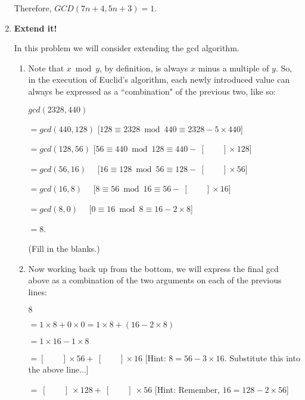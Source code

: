 \documentclass[11pt]{article}
\newif\ifsolutions
\begin{document}
\begin{enumerate}
Therefore, $GCD(7n+4,5n+3)=1$.
\fi

\vspace{30mm}

\item {\bf Extend it!}

In this problem we will consider extending the gcd algorithm.

\begin{enumerate}

\item Note that $x \bmod y$, by definition, is always $x$ minus a multiple of $y$. So, in the execution of Euclid's algorithm, each newly introduced value can always be expressed as a ``combination" of the previous two, like so:

$ gcd(2328, 440)$ 

$= gcd(440, 128)$ [$128 \equiv 2328 \bmod{440} \equiv 2328 - 5 \times 440$] 

$= gcd(128, 56)$   [$56 \equiv 440 \bmod {128} \equiv 440 - \ [\quad \quad] \times 128$]  \ifsolutions  {\bf solution}:  $[?] = 3$ \fi

$= gcd(56, 16)$ \ \  [$16 \equiv 128 \bmod{56} \equiv 128 - \ [\quad \quad] \times 56$]   \ifsolutions  {\bf solution}:  $[?] = 2$ \fi

$= gcd(16, 8)$  \ \ [$8 \equiv 56 \bmod{16} \equiv 56 - \ [\quad \quad] \times 16$] \ifsolutions {\bf solution}: $[?] = 3$ \fi

$= gcd(8, 0)$  \ \ [$0 \equiv 16 \bmod{8} \equiv 16 - 2 \times 8$]

$= 8$.

(Fill in the blanks.)


\item Now working back up from the bottom, we will express the final gcd above as a combination of the two arguments on each of the previous lines:

$8$

$= 1 \times 8 + 0 \times 0 = 1 \times 8 + (16 - 2 \times 8)$

$= 1 \times 16 - 1 \times 8$ 

$= [\quad \quad ] \times 56 + \ [\quad \quad ] \times 16$ [Hint: $8 = 56 - 3 \times 16$. Substitute this into the above line...] \ifsolutions{$1 \times 16 - 1 \times (56 - 3 \times 16) = -1 \times 56 + 4 \times 16$} \fi

$= \ [\quad \quad] \ \times 128 + \ [\quad \quad] \ \times 56$ [Hint: Remember, $16 = 128 - 2 \times 56$] \ifsolutions{$4 \times 128 - 9 \times 56$} \fi


\end{enumerate}
\end{enumerate}
\end{document}
